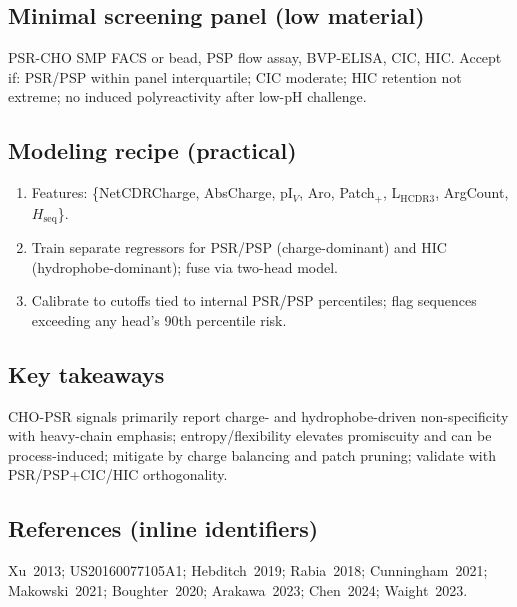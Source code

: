 \subsection*{Minimal screening panel (low material)}
PSR-CHO SMP FACS or bead, PSP flow assay, BVP-ELISA, CIC, HIC. Accept if: PSR/PSP within panel interquartile; CIC moderate; HIC retention not extreme; no induced polyreactivity after low-pH challenge.

\subsection*{Modeling recipe (practical)}
\begin{enumerate}\setlength\itemsep{2pt}
\item Features: \{NetCDRCharge, AbsCharge, pI$_V$, Aro, Patch$_{+}$, L$_{\mathrm{HCDR3}}$, ArgCount, $H_{\mathrm{seq}}$\}.
\item Train separate regressors for PSR/PSP (charge-dominant) and HIC (hydrophobe-dominant); fuse via two-head model.
\item Calibrate to cutoffs tied to internal PSR/PSP percentiles; flag sequences exceeding any head’s 90th percentile risk.
\end{enumerate}

\subsection*{Key takeaways}
CHO-PSR signals primarily report charge- and hydrophobe-driven non-specificity with heavy-chain emphasis; entropy/flexibility elevates promiscuity and can be process-induced; mitigate by charge balancing and patch pruning; validate with PSR/PSP+CIC/HIC orthogonality.

\subsection*{References (inline identifiers)}
Xu~2013; US20160077105A1; Hebditch~2019; Rabia~2018; Cunningham~2021; Makowski~2021; Boughter~2020; Arakawa~2023; Chen~2024; Waight~2023.
